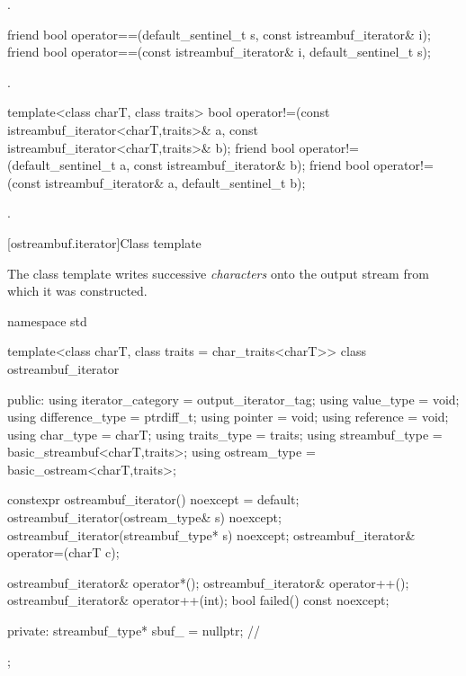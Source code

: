 \begin{itemdescr}
\pnum
\returns
{}.
\end{itemdescr}

%
\begin{itemdecl}
friend bool operator==(default_sentinel_t s, const istreambuf_iterator& i);
friend bool operator==(const istreambuf_iterator& i, default_sentinel_t s);
\end{itemdecl}

\begin{itemdescr}
\pnum
\returns {}.
\end{itemdescr}

%
\begin{itemdecl}
template<class charT, class traits>
  bool operator!=(const istreambuf_iterator<charT,traits>& a,
                  const istreambuf_iterator<charT,traits>& b);
friend bool operator!=(default_sentinel_t a, const istreambuf_iterator& b);
friend bool operator!=(const istreambuf_iterator& a, default_sentinel_t b);
\end{itemdecl}

\begin{itemdescr}
\pnum
\returns
{}.
\end{itemdescr}

[ostreambuf.iterator]{Class template }

\pnum
The class template 
writes successive \textit{characters} onto the output stream
from which it was constructed.

%
\begin{codeblock}
namespace std {
  template<class charT, class traits = char_traits<charT>>
  class ostreambuf_iterator {
  public:
    using iterator_category = output_iterator_tag;
    using value_type        = void;
    using difference_type   = ptrdiff_t;
    using pointer           = void;
    using reference         = void;
    using char_type         = charT;
    using traits_type       = traits;
    using streambuf_type    = basic_streambuf<charT,traits>;
    using ostream_type      = basic_ostream<charT,traits>;

    constexpr ostreambuf_iterator() noexcept = default;
    ostreambuf_iterator(ostream_type& s) noexcept;
    ostreambuf_iterator(streambuf_type* s) noexcept;
    ostreambuf_iterator& operator=(charT c);

    ostreambuf_iterator& operator*();
    ostreambuf_iterator& operator++();
    ostreambuf_iterator& operator++(int);
    bool failed() const noexcept;

  private:
    streambuf_type* sbuf_ = nullptr;    // \expos
  };
}
\end{codeblock}


